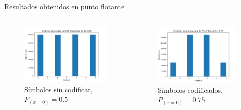 \documentclass[xcolor=table]{beamer}
\begin{document}
\begin{frame}{Resultados obtenidos en punto flotante}
\begin{columns}

    \begin{column}{0.506\paperwidth}
    \begin{figure}
        \centering
        \includegraphics[width=\textwidth]{Graficos/Generated_symbols.png}%
        \caption{Símbolos sin codificar, $P_{(x=0)}=0.5$}
    \end{figure}
    \end{column}
            

    \begin{column}{0.48\paperwidth}  
    \begin{figure}
        \centering
        \includegraphics[width=\textwidth]{Graficos/coded_symbols_6.png}
        \caption{Símbolos codificados, $P_{(x=0)}=0.75$}
    \end{figure}
    \end{column}
    
\end{columns}
\end{frame}
\end{document}
